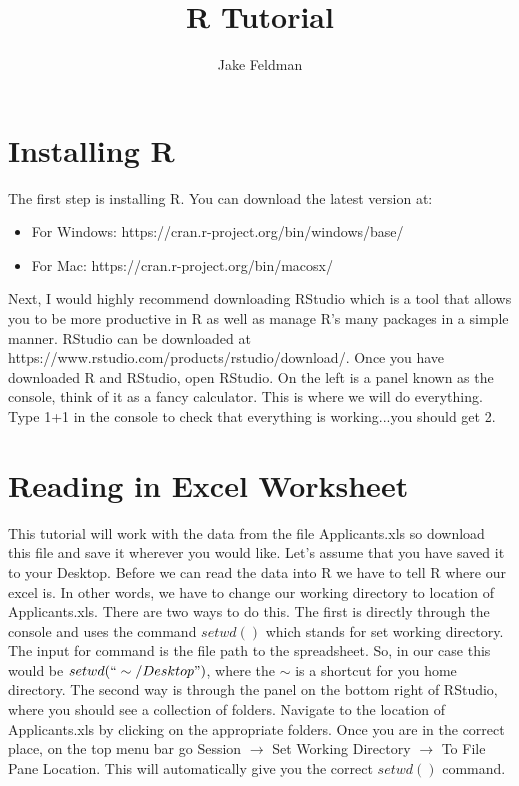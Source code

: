 \documentclass[11pt]{article}
\begin{document}
\title{R Tutorial}
\author{Jake Feldman}

\maketitle

\section{Installing R}

The first step is installing R.  You can download the latest version at: 

\begin{itemize}
\item For Windows: https://cran.r-project.org/bin/windows/base/
\item For Mac: https://cran.r-project.org/bin/macosx/
\end{itemize}

Next, I would highly recommend downloading RStudio which is a tool that allows you to be more productive in R as well as manage R's many packages in a simple manner.  RStudio can be downloaded at https://www.rstudio.com/products/rstudio/download/.  Once you have downloaded R and RStudio, open RStudio.  On the left is a panel known as the console, think of it as a fancy calculator.  This is where we will do everything. Type 1+1 in the console to check that everything is working...you should get 2.

\section{Reading in Excel Worksheet}

This tutorial will work with the data from the file Applicants.xls so download this file and save it wherever you would like.  Let's assume that you have saved it to your Desktop.  Before we can read the data into R we have to tell R where our excel is.  In other words, we have to change our working directory to location of Applicants.xls.  There are two ways to do this.  The first is directly through the console and uses the command $setwd()$ which stands for set working directory.  The input for command is the file path to the spreadsheet.  So, in our case this would be $setwd(``\sim/Desktop")$, where the $\sim$ is a shortcut for you home directory.  The second way is through the panel on the bottom right of RStudio, where you should see a collection of folders. Navigate to the location of Applicants.xls by clicking on the appropriate folders.  Once you are in the correct place, on the top menu bar go Session $\rightarrow$ Set Working Directory $\rightarrow$ To File Pane Location. This will automatically give you the correct $setwd()$ command.
\end{document}
